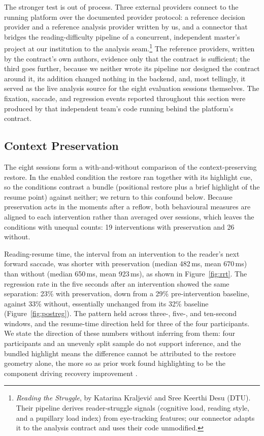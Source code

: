 The stronger test is out of process.
Three external providers connect to the running platform over the documented provider protocol: a reference decision provider and a reference analysis provider written by us, and a connector that bridges the reading-difficulty pipeline of a concurrent, independent master's project at our institution to the analysis seam.\footnote{\emph{Reading the Struggle}, by Katarina Kraljevi\'{c} and Sree Keerthi Desu (DTU).
Their pipeline derives reader-struggle signals (cognitive load, reading style, and a pupillary load index) from eye-tracking features; our connector adapts it to the analysis contract and uses their code unmodified.
}
The reference providers, written by the contract's own authors, evidence only that the contract is sufficient; the third goes further, because we neither wrote its pipeline nor designed the contract around it, its addition changed nothing in the backend, and, most tellingly, it served as the live analysis source for the eight evaluation sessions themselves.
The fixation, saccade, and regression events reported throughout this section were produced by that independent team's code running behind the platform's contract.

\subsection{Context Preservation}
\label{sec:eval-context}

The eight sessions form a with-and-without comparison of the context-preserving restore.
In the enabled condition the restore ran together with its highlight cue, so the conditions contrast a bundle (positional restore plus a brief highlight of the resume point) against neither; we return to this confound below.
Because preservation acts in the moments after a reflow, both behavioural measures are aligned to each intervention rather than averaged over sessions, which leaves the conditions with unequal counts: 19 interventions with preservation and 26 without.

Reading-resume time, the interval from an intervention to the reader's next forward saccade, was shorter with preservation (median 482\,ms, mean 670\,ms) than without (median 650\,ms, mean 923\,ms), as shown in Figure~\ref{fig:rrt}.
The regression rate in the five seconds after an intervention showed the same separation: 23\% with preservation, down from a 29\% pre-intervention baseline, against 33\% without, essentially unchanged from its 32\% baseline (Figure~\ref{fig:postreg}).
The pattern held across three-, five-, and ten-second windows, and the resume-time direction held for three of the four participants.
We state the direction of these numbers without inferring from them: four participants and an unevenly split sample do not support inference, and the bundled highlight means the difference cannot be attributed to the restore geometry alone, the more so as prior work found highlighting to be the component driving recovery improvement \cite{jensen2025context}.

